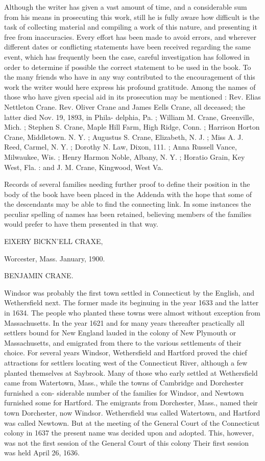 \documentclass{book}
\begin{document}
Although the writer has given a vast amount of time, and a 
considerable sum from his means in prosecuting this work, still 
he is fully aware how difficult is the task of collecting material 
and compiling a work of this nature, and presenting it free from 
inaccuracies. Every effort has been made to avoid errors, and 
wherever different dates or conflicting statements have been 
received regarding the same event, which has frequently been 
the case, careful investigation has followed in order to determine 
if possible the correct statement to be used in the book. To 
the many friends who have in any way contributed to the 
encouragement of this work the writer would here express his 
profound gratitude. Among the names of those who have 
given special aid in its prosecution may be mentioned : Rev. 
Elias Nettleton Crane. Rev. Oliver Crane and James Eells 
Crane, all deceased; the latter died Nov. 19, 1893, in Phila- 
delphia, Pa. ; William M. Crane, Greenville, Mich. ; Stephen S. 
Crane, Maple Hill Farm, High Ridge, Conn. ; Harrison Horton 
Crane, Middletown. N. Y. ; Augustus S. Crane, Elizabeth, N. J. ; 
Miss A. J. Reed, Carmel, N. Y. ; Dorothy N. Law, Dixon, 111. ; 
Anna Russell Vance, Milwaukee, Wis. ; Henry Harmon Noble, 
Albany, N. Y. ; Horatio Grain, Key West, Fla. : and J. M. 
Crane, Kingwood, West Va. 

Records of several families needing further proof to define 
their position in the body of the book have been placed in the 
Addenda with the hope that some of the descendants may be 
able to find the connecting link. In some instances the peculiar 
spelling of names has been retained, believing members of the 
families would prefer to have them presented in that way. 

ElXERY BlCKN'ELL CRAXE, 

Worcester, Mass. 
January, 1900. 


BENJAMIN CRANE. 



Windsor was probably the first town settled in Connecticut by 
the English, and Wethersfield next. The former made its 
beginuing in the year 1633 and the latter in 1634. The people 
who planted these towns were almost without exception from 
Massachusetts. In the year 1621 and for many years thereafter 
practically all settlers bound for New England lauded in the 
colony of New Plymouth or Massachusetts, and emigrated from 
there to the various settlements of their choice. For several 
years Windsor, Wethersfield and Hartford proved the chief 
attractions for settlers locating west of the Connecticut River, 
although a few planted themselves at Saybrook. Many of those 
who early settled at Wethersfield came from Watertown, Mass., 
while the towns of Cambridge and Dorchester furnished a con- 
siderable number of the families for Windsor, and Newtown 
furnished some for Hartford. The emigrants from Dorchester, 
Mass., named their town Dorchester, now Windsor. Wethersfield 
was called Watertown, and Hartford was called Newtown. But 
at the meeting of the General Court of the Connecticut colony 
in 1637 the present name was decided upon and adopted. This, 
however, was not the first session of the General Court of 
this colony Their first session was held April 26, 1636. 
\end{document}
